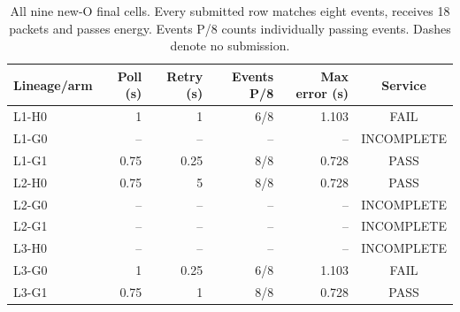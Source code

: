 \begin{table}[!htbp]
\centering\small
\caption{All nine new-O final cells. Every submitted row matches eight events, receives 18 packets and passes energy. Events P/8 counts individually passing events. Dashes denote no submission.}
\label{tab:ofinal}
\begin{tabular}{@{}lrrrrc@{}}\toprule
Lineage/arm & Poll (s) & Retry (s) & Events P/8 & Max error (s) & Service \\\midrule
L1-H0 & 1 & 1 & 6/8 & 1.103 & FAIL \\
L1-G0 & -- & -- & -- & -- & INCOMPLETE \\
L1-G1 & 0.75 & 0.25 & 8/8 & 0.728 & PASS \\
L2-H0 & 0.75 & 5 & 8/8 & 0.728 & PASS \\
L2-G0 & -- & -- & -- & -- & INCOMPLETE \\
L2-G1 & -- & -- & -- & -- & INCOMPLETE \\
L3-H0 & -- & -- & -- & -- & INCOMPLETE \\
L3-G0 & 1 & 0.25 & 6/8 & 1.103 & FAIL \\
L3-G1 & 0.75 & 1 & 8/8 & 0.728 & PASS \\
\bottomrule\end{tabular}
\end{table}
